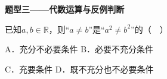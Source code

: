 \documentclass[12pt,a4paper]{article}
\newcommand{\qtitle}[1]{{\Large\bfseries\color[HTML]{1F3864}#1}\par\vspace{0.9em}}
\begin{document}
\qtitle{题型三——代数运算与反例判断}

已知$a,b\in\mathbb{R}$，则“$a\ne b$”是“$a^2\ne b^2$”的（　）\par
\vspace{0.9em}
A．充分不必要条件 \qquad\qquad B．必要不充分条件\par
\vspace{0.45em}
C．充要条件 \qquad\qquad D．既不充分也不必要条件\par
\vspace{0.45em}
\end{document}
